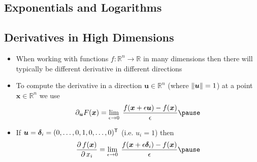 
\begin{slide}
\section[-2]{Exponentials and Logarithms}

\pb
\pause{} 
\begin{center}
\pause  
\end{center}

\end{slide}


\Outline %

\begin{slide}
\section{Derivatives in High Dimensions}

\begin{PauseHighLight}
  \begin{itemize}
  \item When working with functions $f:\mathbb{R}^n \rightarrow
    \mathbb{R}$ in many dimensions then there will typically be
    different derivative in different directions\pause
  \item To compute the derivative in a direction
    $\bm{u} \in \mathbb{R}^n$ (where $\| \bm{u} \|=1$) at a point
    $\bm{x} \in \mathbb{R}^n$ we use
    \begin{align*}
      \partial_{\bm{u}} F(\bm{x}) = \lim_{\epsilon\rightarrow0}\;
      \frac{f(\bm{x}+ \epsilon \bm{u}) - f(\bm{x})}{\epsilon}\pause
    \end{align*}
  \item If $\bm{u} = \bm{\delta}_i = (0,\ldots,0,1,0,\ldots,0)^{\textsf{T}}$
    (i.e. $u_i = 1$) then
    \begin{align*}
      \pd{f(\bm{x})}{x_i} = \lim_{\epsilon\rightarrow0}\;
      \frac{f(\bm{x}+ \epsilon \bm{\delta}_i) - f(\bm{x})}{\epsilon}\pause
    \end{align*}
  \end{itemize}
\end{PauseHighLight}

\end{slide}

